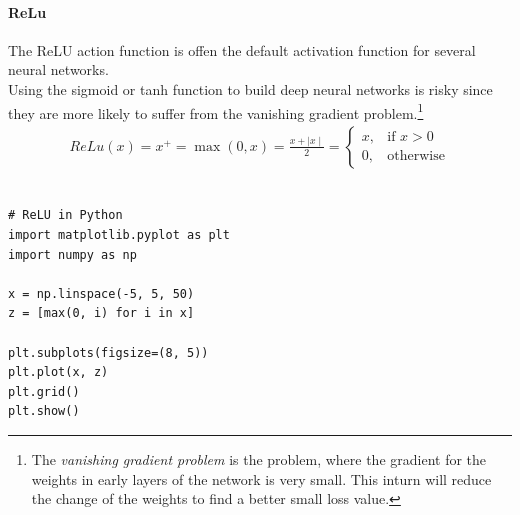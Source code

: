 \paragraph{ReLu}
The \gls{ReLU} action function is offen the default activation function for several neural networks.\\

Using the sigmoid or tanh function to build deep neural networks is risky since they are more likely to suffer from the vanishing gradient problem.\footnote{
	The \textit{vanishing gradient problem} is the problem, where the gradient for the weights in early layers of the network is very small. This inturn will reduce the change of the weights to find a better small loss value.
}
\begin{align}
	ReLu(x) = x^+ = \max(0,x) = \frac{x + \mid x \mid}{2} = \begin{cases}
	x,& \text{if } x> 0\\
    0,& \text{otherwise}
\end{cases}
\end{align}

\begin{lstlisting}[language=iPython, caption={Example code to create a ReLU}]

# ReLU in Python
import matplotlib.pyplot as plt
import numpy as np

x = np.linspace(-5, 5, 50)
z = [max(0, i) for i in x]

plt.subplots(figsize=(8, 5))
plt.plot(x, z)
plt.grid()
plt.show()

\end{lstlisting}

